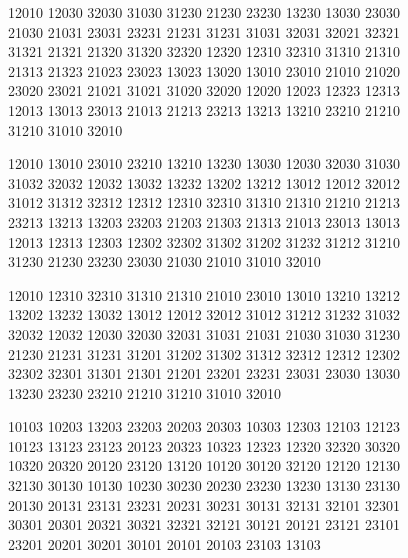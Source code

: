\begingroup\small\ttfamily\begin{flushleft}
12010 12030 32030 31030 31230 21230 23230 13230 13030 23030\\
21030 21031 23031 23231 21231 31231 31031 32031 32021 32321\\
31321 21321 21320 31320 32320 12320 12310 32310 31310 21310\\
21313 21323 21023 23023 13023 13020 13010 23010 21010 21020\\
23020 23021 21021 31021 31020 32020 12020 12023 12323 12313\\
12013 13013 23013 21013 21213 23213 13213 13210 23210 21210\\
31210 31010 32010\\
\end{flushleft}\endgroup
\begingroup\small\ttfamily\begin{flushleft}
12010 13010 23010 23210 13210 13230 13030 12030 32030 31030\\
31032 32032 12032 13032 13232 13202 13212 13012 12012 32012\\
31012 31312 32312 12312 12310 32310 31310 21310 21210 21213\\
23213 13213 13203 23203 21203 21303 21313 21013 23013 13013\\
12013 12313 12303 12302 32302 31302 31202 31232 31212 31210\\
31230 21230 23230 23030 21030 21010 31010 32010\\
\end{flushleft}\endgroup
\begingroup\small\ttfamily\begin{flushleft}
12010 12310 32310 31310 21310 21010 23010 13010 13210 13212\\
13202 13232 13032 13012 12012 32012 31012 31212 31232 31032\\
32032 12032 12030 32030 32031 31031 21031 21030 31030 31230\\
21230 21231 31231 31201 31202 31302 31312 32312 12312 12302\\
32302 32301 31301 21301 21201 23201 23231 23031 23030 13030\\
13230 23230 23210 21210 31210 31010 32010\\
\end{flushleft}\endgroup
\begingroup\small\ttfamily\begin{flushleft}
10103 10203 13203 23203 20203 20303 10303 12303 12103 12123\\
10123 13123 23123 20123 20323 10323 12323 12320 32320 30320\\
10320 20320 20120 23120 13120 10120 30120 32120 12120 12130\\
32130 30130 10130 10230 30230 20230 23230 13230 13130 23130\\
20130 20131 23131 23231 20231 30231 30131 32131 32101 32301\\
30301 20301 20321 30321 32321 32121 30121 20121 23121 23101\\
23201 20201 30201 30101 20101 20103 23103 13103\\
\end{flushleft}\endgroup
